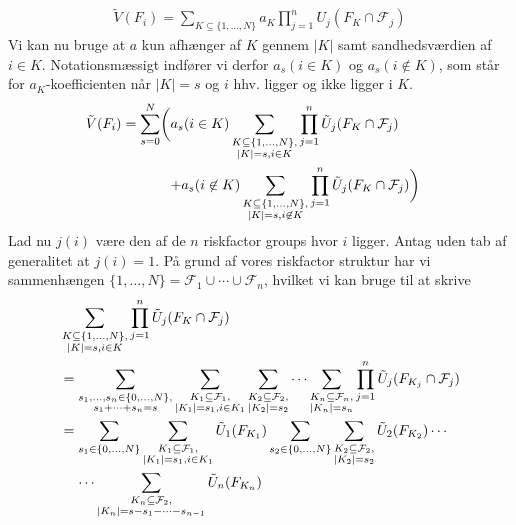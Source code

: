 \documentclass[a4paper, 12pt]{article}
\begin{document}
\begin{align*}
\tilde V(F_i)=\sum_{K\subseteq \{1, \dots, N\}} a_K \prod_{j=1}^n U_j(F_K\cap \mathcal F_j)
\end{align*}
Vi kan nu bruge at $a$ kun afhænger af $K$ gennem $|K|$ samt sandhedsværdien af $i\in K$. Notationsmæssigt indfører vi derfor $a_{s}(i\in K)$ og $a_s(i\not\in K)$, som står for $a_K$-koefficienten når $|K|=s$ og $i$ hhv. ligger og ikke ligger i $K$. 
\begin{align}
\tilde V(F_i)&=\sum_{s=0}^N \biggl(\begin{lgathered}[t]a_s(i\in K) \sum_{\substack{K\subseteq \{1, \dots, N\},\\ |K|=s,
i\in K}}\prod_{j=1}^n \tilde U_j(F_K\cap \mathcal F_j)\\
+a_s(i\not\in K) \sum_{\substack{K\subseteq \{1, \dots, N\},\\ |K|=s,
i\not\in K}}\prod_{j=1}^n \tilde  U_j(F_K\cap \mathcal F_j)\biggr)\end{lgathered}
\end{align}
Lad nu $j(i)$ være den af de $n$ riskfactor groups hvor $i$ ligger. Antag uden tab af generalitet at $j(i)=1$. På grund af vores riskfactor struktur har vi sammenhængen $\{1, \dots, N\}=\mathcal F_1\cup \cdots \cup \mathcal F_n$, hvilket vi kan bruge til at skrive
\begin{align}
 &\sum_{\substack{K\subseteq \{1, \dots, N\},\\ |K|=s, i\in K}}\prod_{j=1}^n \tilde U_j(F_K\cap \mathcal F_j)\\
 &= \sum_{\substack{s_1, \dots, s_n\in \{0,\dots,N\},\\
s_1+\dots+s_n=s}} \sum_{\substack{K_1\subseteq \mathcal F_1, \\ |K_1|=s_1, i\in K_1}}\sum_{\substack{K_2\subseteq \mathcal F_2, \\ |K_2|=s_2}}\cdots \sum_{\substack{K_n\subseteq \mathcal F_n, \\ |K_n|=s_n}} \prod_{j=1}^n \tilde U_j(F_{K_j}\cap \mathcal F_j)\\
&=\begin{lgathered}[t]\sum_{s_1\in \{0, \dots, N\}}\sum_{\substack{K_1\subseteq \mathcal F_1, \\ |K_1|=s_1, i\in K_1}} \tilde U_1(F_{K_1}) \sum_{s_2\in \{0, \dots, N\}}\sum_{\substack{K_2\subseteq \mathcal F_2, \\ |K_2|=s_2}}\tilde U_2(F_{K_2})\cdots \\ \cdots\sum_{\substack{K_n\subseteq \mathcal F_2, \\  |K_n|=s-s_1-\dots-s_{n-1}}}\tilde U_n(F_{K_n})\end{lgathered}
\end{align}
\end{document}
